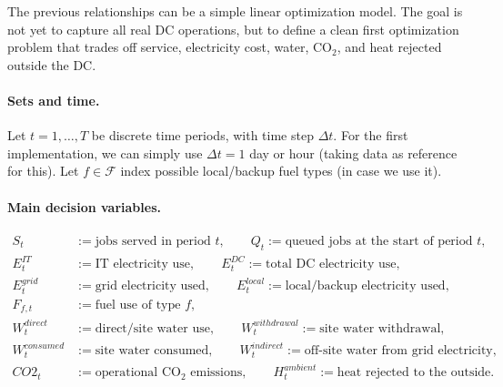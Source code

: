 \documentclass{article}
\begin{document}
\noindent The previous relationships can be a simple linear optimization model. The goal is not yet to capture all real DC operations, but to define a clean first optimization problem that trades off service, electricity cost, water, CO$_2$, and heat rejected outside the DC.

\paragraph{Sets and time.}
Let $t=1,\ldots,T$ be discrete time periods, with time step $\Delta t$. For the first implementation, we can simply use $\Delta t=1$ day or hour (taking data as reference for this). Let $f\in\mathcal{F}$ index possible local/backup fuel types (in case we use it).

\paragraph{Main decision variables.}
\begin{align*}
    S_t &:= \text{jobs served in period }t,\qquad
    Q_t := \text{queued jobs at the start of period }t,\\
    E_t^{IT} &:= \text{IT electricity use},\qquad
    E_t^{DC} := \text{total DC electricity use},\\
    E_t^{grid} &:= \text{grid electricity used},\qquad
    E_t^{local} := \text{local/backup electricity used},\\
    F_{f,t} &:= \text{fuel use of type }f,\\
    W_t^{direct} &:= \text{direct/site water use},\qquad
    W_t^{withdrawal}:=\text{site water withdrawal},\\
    W_t^{consumed} &:= \text{site water consumed},\qquad
    W_t^{indirect}:=\text{off-site water from grid electricity},\\
    CO2_t &:= \text{operational CO$_2$ emissions},\qquad
    H_t^{ambient}:=\text{heat rejected to the outside}.
\end{align*}
\end{document}
